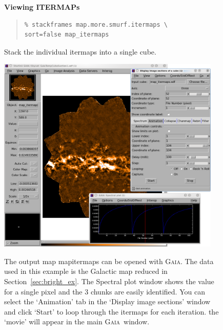 \documentclass[twoside,11pt]{article}
\newcommand{\htmlref}[2]{#1}
\newenvironment{latexonly}{}{}
\newcommand{\latexhtml}[2]{#1}
\newcommand{\xref}[3]{#1}
\renewcommand{\_}{\texttt{\symbol{95}}}
\newenvironment{fmpage}[1]{\begin{lrbox}{\fmbox}\begin{minipage}{#1}}{\end{minipage}\end{lrbox}\fbox{\usebox{\fmbox}}}
\newenvironment{myquote}{\begin{quote}\begin{small}}{\end{small}\end{quote}}
\newcommand{\gaia}{\xref{\textsc{Gaia}}{sun214}{}}
\newcommand{\cref}[3]{\latexhtml{#1~\ref{#2}}{\htmlref{#3}{#2}}}
\begin{document}
\begin{latexonly}
\begin{figure}[ht!]
\begin{center}
\begin{fmpage}{0.95\linewidth}
\vspace{0.2cm}
\hspace{2mm}
\textbf{Viewing ITERMAPs}

\vspace{0.5cm}

\begin{minipage}[c]{0.65\linewidth}

\begin{myquote}
\begin{verbatim}
% stackframes map.more.smurf.itermaps \
sort=false map_itermaps
\end{verbatim}
\end{myquote}
\end{minipage}
\hspace{0.3cm}
\begin{minipage}[c]{0.29\linewidth}
Stack the individual itermaps into a single cube.
\end{minipage}

\vspace{0.5cm}

\begin{minipage}[c]{0.65\linewidth}
\centering
\includegraphics[width=0.95\textwidth]{sc21_itermaps_anim}

\end{minipage}
\hspace{0.3cm}
\begin{minipage}[c]{0.29\linewidth}
The output map map\_itermaps can be opened with \gaia. The data used
in this example is the Galactic map reduced in
\cref{Section}{sec:bright_ex}{dimmconfig\_bright\_extended.lis}. The
Spectral plot window shows the value for a single pixel and the 3
chunks are easily identified. You can select the `Animation' tab in
the `Display image sections' window and click `Start' to loop through
the itermaps for each iteration. the `movie' will appear in the main
\gaia\ window.
\end{minipage}


\end{fmpage}
\end{center}
\end{figure}
\end{latexonly}
\end{document}
